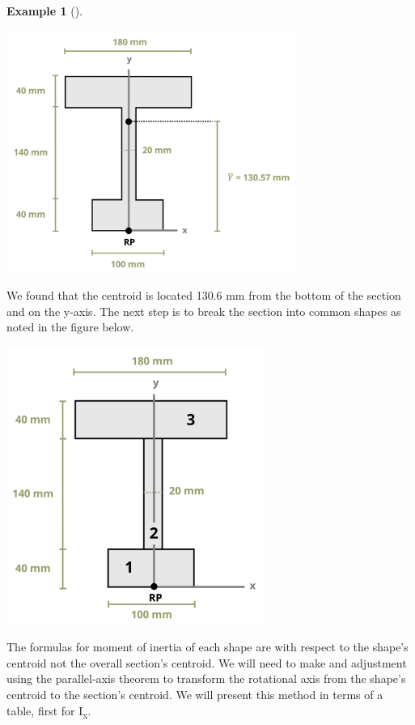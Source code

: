 \documentclass[
  letterpaper,
  DIV=11,
  numbers=noendperiod]{scrreprt}
\theoremstyle{definition}
\newtheorem{example}{Example}[chapter]
\theoremstyle{remark}
\begin{document}
\begin{tcolorbox}
\begin{example}[]
\begin{tcolorbox}
\begin{center}
\includegraphics[width=3.72917in,height=\textheight]{images/CH 8 PNGs/example 8.5 part 2.png}
\end{center}

We found that the centroid is located 130.6 mm from the bottom of the
section and on the y-axis. The next step is to break the section into
common shapes as noted in the figure below.

\begin{center}
\includegraphics[width=3.3125in,height=\textheight]{images/CH 8 PNGs/example 8.5 part 3.png}
\end{center}

The formulas for moment of inertia of each shape are with respect to the
shape's centroid not the overall section's centroid. We will need to
make and adjustment using the parallel-axis theorem to transform the
rotational axis from the shape's centroid to the section's centroid. We
will present this method in terms of a table, first for
I\textsubscript{x}.


\end{tcolorbox}
\end{example}
\end{tcolorbox}
\end{document}
